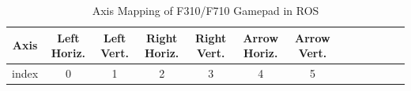 \documentclass[{../../master}]{subfiles}
\begin{document}
\begin{table}[h]
  \begin{center}
    \caption{Axis Mapping of F310/F710 Gamepad in ROS}
    \begin{tabular}{|c|c|c|c|c|c|c|c|c|c|c|c|c|} \hline
      Axis  & Left Horiz. & Left Vert. & Right Horiz. & Right Vert. & Arrow Horiz. & Arrow Vert. \\ \hline
      index & 0 & 1 & 2 & 3 & 4  & 5 \\ \hline
    \end{tabular}
    \label{tab:axis_mapping}
  \end{center}
\end{table}
\end{document}
